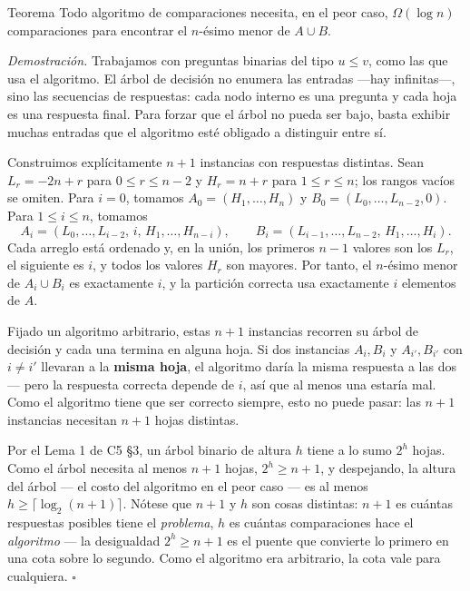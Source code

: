 \documentclass[11pt]{article}
\begin{document}
\begin{resultado}{Teorema}
Todo algoritmo de comparaciones necesita, en el peor caso, $\Omega(\log n)$ comparaciones para encontrar el
$n$-ésimo menor de $A\cup B$.
\end{resultado}

\textit{Demostración.} Trabajamos con preguntas binarias del tipo $u\le v$, como las que usa el algoritmo.
El árbol de decisión no enumera las entradas ---hay infinitas---, sino las secuencias de respuestas: cada
nodo interno es una pregunta y cada hoja es una respuesta final. Para forzar que el árbol no pueda ser bajo,
basta exhibir muchas entradas que el algoritmo esté obligado a distinguir entre sí.

Construimos explícitamente $n+1$ instancias con respuestas distintas. Sean
$L_r=-2n+r$ para $0\le r\le n-2$ y $H_r=n+r$ para $1\le r\le n$; los rangos vacíos se omiten.
Para $i=0$, tomamos $A_0=(H_1,\dots,H_n)$ y $B_0=(L_0,\dots,L_{n-2},0)$. Para $1\le i\le n$,
tomamos
\[
A_i=(L_0,\dots,L_{i-2},\,i,\,H_1,\dots,H_{n-i}),\qquad
B_i=(L_{i-1},\dots,L_{n-2},\,H_1,\dots,H_i).
\]
Cada arreglo está ordenado y, en la unión, los primeros $n-1$ valores son los $L_r$, el siguiente es $i$,
y todos los valores $H_r$ son mayores. Por tanto, el $n$-ésimo menor de $A_i\cup B_i$ es exactamente
$i$, y la partición correcta usa exactamente $i$ elementos de $A$.

Fijado un algoritmo arbitrario, estas $n+1$ instancias recorren su árbol de decisión y cada una termina en
alguna hoja. Si dos instancias $A_i,B_i$ y $A_{i'},B_{i'}$ con $i\ne i'$ llevaran a la \textbf{misma hoja},
el algoritmo daría la misma respuesta a las dos --- pero la respuesta correcta depende de $i$, así que al
menos una estaría mal. Como el algoritmo tiene que ser correcto siempre, esto no puede pasar: las $n+1$
instancias necesitan $n+1$ hojas distintas.

Por el Lema 1 de C5 §3, un árbol binario de altura $h$ tiene a lo sumo $2^h$ hojas. Como el árbol necesita
al menos $n+1$ hojas, $2^h\ge n+1$, y despejando, la altura del árbol --- el costo del algoritmo en el peor
caso --- es al menos $h\ge\lceil\log_2(n{+}1)\rceil$. Nótese que $n+1$ y $h$ son cosas distintas: $n+1$ es
cuántas respuestas posibles tiene el \emph{problema}, $h$ es cuántas comparaciones hace el \emph{algoritmo}
--- la desigualdad $2^h\ge n+1$ es el puente que convierte lo primero en una cota sobre lo segundo. Como el
algoritmo era arbitrario, la cota vale para cualquiera. $\square$
\end{document}
